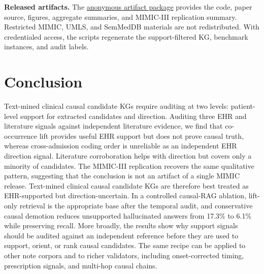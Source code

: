 \documentclass[runningheads]{llncs}
\begin{document}
\noindent\textbf{Released artifacts.} The \href{https://anonymous.4open.science/r/clinical-causal-kg-artifact-C950/}{anonymous artifact package} provides the code, paper source, figures, aggregate summaries, and MIMIC-III replication summary. Restricted MIMIC, UMLS, and SemMedDB materials are not redistributed. With credentialed access, the scripts regenerate the support-filtered KG, benchmark instances, and audit labels.

\section{Conclusion}
Text-mined clinical causal candidate KGs require auditing at two levels: patient-level support for extracted candidates and direction. Auditing three EHR and literature signals against independent literature evidence, we find that co-occurrence lift provides useful EHR support but does not prove causal truth, whereas cross-admission coding order is unreliable as an independent EHR direction signal. Literature corroboration helps with direction but covers only a minority of candidates. The MIMIC-III replication recovers the same qualitative pattern, suggesting that the conclusion is not an artifact of a single MIMIC release. Text-mined clinical causal candidate KGs are therefore best treated as EHR-supported but direction-uncertain. In a controlled causal-RAG ablation, lift-only retrieval is the appropriate base after the temporal audit, and conservative causal demotion reduces unsupported hallucinated answers from 17.3\% to 6.1\% while preserving recall. More broadly, the results show why support signals should be audited against an independent reference before they are used to support, orient, or rank causal candidates. The same recipe can be applied to other note corpora and to richer validators, including onset-corrected timing, prescription signals, and multi-hop causal chains.

\begingroup
\let\oldthebibliography\thebibliography
\let\endoldthebibliography\endthebibliography
\renewenvironment{thebibliography}[1]{%
  \oldthebibliography{#1}%
  \footnotesize
  \setlength{\itemsep}{0pt}%
  \setlength{\parsep}{0pt}%
}{\endoldthebibliography}


\endgroup
\end{document}

